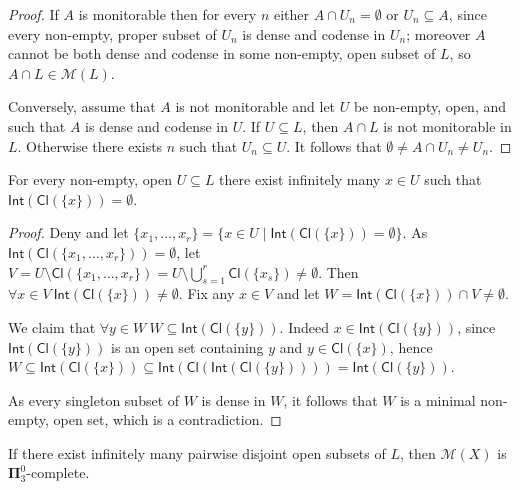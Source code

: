 \documentclass{lmcs}
\newcommand{\bpi}{\boldsymbol\Pi}
\newcommand{\Cl}[1]{\mathsf{Cl}(#1)}
\newcommand{\Int}[1]{\mathsf{Int}(#1)}
\begin{document}
\begin{proof}
If $A$ is monitorable then for every $n$ either $A\cap U_n=\emptyset $ or $U_n\subseteq A$, since every non-empty, proper subset of $U_n$ is dense and codense in $U_n$; moreover $A$ cannot be both dense and codense in some non-empty, open subset of $L$, so $A\cap L\in \mathcal M (L)$.

Conversely, assume that $A$ is not monitorable and let $U$ be non-empty, open, and such that $A$ is dense and codense in $U$.
If $U\subseteq L$, then $A\cap L$ is not monitorable in $L$.
Otherwise there exists $n$ such that $U_n\subseteq U$.
It follows that $\emptyset\ne A\cap U_n\ne U_n$.
\end{proof}

\begin{lem} \label{lem:verymany}
For every non-empty, open $U\subseteq L$ there exist infinitely many $x\in U$ such that $ \Int{ \Cl{\{ x\} } } =\emptyset $.
\end{lem}

\begin{proof}
Deny and let $\{ x_1,\ldots ,x_r\} =\{ x\in U\mid \Int{ \Cl{\{ x\} } } =\emptyset\} $.
As $ \Int{ \Cl{ \{ x_1,\ldots ,x_r\} } } =\emptyset $, let $V=U\setminus \Cl{ \{ x_1,\ldots ,x_r\} } =U\setminus\bigcup_{s=1}^r \Cl{\{ x_s\} } \ne\emptyset $.
Then $\forall x\in V\ \Int{ \Cl{\{ x\} } } \ne\emptyset $.
Fix any $x\in V$ and let $W= \Int{ \Cl{\{ x\} } } \cap V\ne\emptyset $.

We claim that $\forall y\in W\ W\subseteq \Int{ \Cl{\{ y \}} } $.
Indeed $x\in \Int{ \Cl{\{ y\} } } $, since $ \Int{ \Cl{\{ y\} } }$ is an open set containing $y$ and $y\in \Cl{ \{ x\} } $, hence $W\subseteq \Int{ \Cl{\{ x\}} } \subseteq \Int{ \Cl{ \Int{ \Cl{ \{ y\} } } } } = \Int{ \Cl{\{ y\} } } $.

As every singleton subset of $W$ is dense in $W$, it follows that $W$ is a minimal non-empty, open set, which is a contradiction.
\end{proof}

\begin{lem} \label{lem:conditionpi}
If there exist infinitely many pairwise disjoint open subsets of $L$, then $ \mathcal M (X)$ is $ \bpi^0_3$-complete.
\end{lem}
\end{document}
